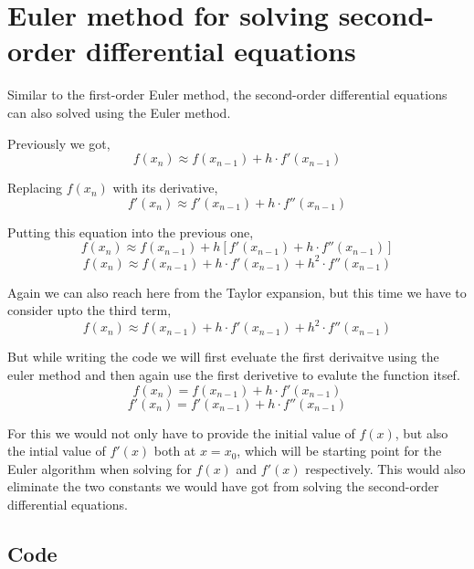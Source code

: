    
    
    

    
    \hypertarget{euler-method-for-solving-second-order-differential-equations}{%
\section{Euler method for solving second-order differential
equations}\label{euler-method-for-solving-second-order-differential-equations}}

    Similar to the first-order Euler method, the second-order differential
equations can also solved using the Euler method.

Previously we got, \[f(x_n) \approx f(x_{n-1}) + h \cdot f'(x_{n-1})\]

Replacing \(f(x_n)\) with its derivative,
\[f'(x_n) \approx f'(x_{n-1}) + h \cdot f''(x_{n-1})\]

Putting this equation into the previous one,
\[f(x_n) \approx f(x_{n-1}) + h \left[ f'(x_{n-1}) + h \cdot f''(x_{n-1}) \right]\]
\[f(x_n) \approx f(x_{n-1}) + h \cdot f'(x_{n-1}) + h^2 \cdot f''(x_{n-1})\]

    Again we can also reach here from the Taylor expansion, but this time we
have to consider upto the third term,
\[f(x_n) \approx f(x_{n-1}) + h \cdot f'(x_{n-1}) + h^2 \cdot f''(x_{n-1})\]

    But while writing the code we will first eveluate the first derivaitve
using the euler method and then again use the first derivetive to
evalute the function itsef.
\[f(x_n) = f(x_{n-1}) + h \cdot f'(x_{n-1})\]
\[f'(x_n) = f'(x_{n-1}) + h \cdot f''(x_{n-1})\]

For this we would not only have to provide the initial value of
\(f(x)\), but also the intial value of \(f'(x)\) both at \(x= x_0\),
which will be starting point for the Euler algorithm when solving for
\(f(x)\) and \(f'(x)\) respectively. This would also eliminate the two
constants we would have got from solving the second-order differential
equations.

    \hypertarget{code}{%
\subsection{Code}\label{code}}

